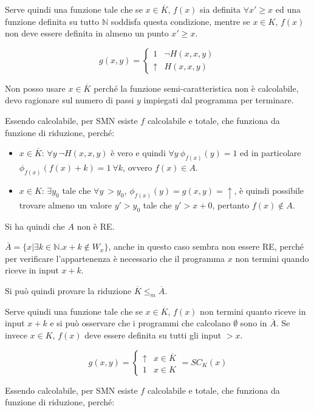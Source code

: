 Serve quindi una funzione tale che se $x \in \overline{K}$, $f(x)$ sia definita $\forall x' \geq x$ ed una funzione definita su tutto $\mathbb{N}$ soddisfa questa condizione, mentre se $x \in K$, $f(x)$ non deve essere definita in almeno un punto $x' \geq x$.

$$
g(x,y)= \begin{cases}
1 & \neg H(x,x,y) \\
\uparrow & H(x,x,y) 
\end{cases}
$$

Non posso usare $x \in \overline{K}$ perché la funzione semi-caratteristica non è calcolabile, devo ragionare sul numero di passi $y$ impiegati dal programma per terminare.

Essendo calcolabile, per SMN esiste $f$ calcolabile e totale, che funziona da funzione di riduzione, perché:

\begin{itemize}
	\item $x \in \overline{K}$: $\forall y \: \neg H(x,x,y)$ è vero e quindi $\forall y \: \phi_{f(x)}(y) = 1$ ed in particolare $\phi_{f(x)}(f(x)+k) = 1 \: \forall k$, ovvero $f(x) \in A$.
	\item $x \in K$: $\exists y_0 $ tale che $\forall y \: > y_0$, $\phi_{f(x)}(y) = g(x,y) = \uparrow$, è quindi possibile trovare almeno un valore $y' > y_0$ tale che $y' > x + 0$, pertanto $f(x) \notin A$.
\end{itemize}

Si ha quindi che $A$ non è RE.

$\overline{A} = \{ x | \exists k \in \mathbb{N} . x +k \notin W_x \}$, anche in questo caso sembra non essere RE, perché per verificare l'appartenenza è necessario che il programma $x$ non termini quando riceve in input $x+k$.

Si può quindi provare la riduzione $\overline{K} \leq_m \overline{A} $.

Serve quindi una funzione tale che se $x \in \overline{K}$, $f(x)$ non termini quanto riceve in input $x+k$ e si può osservare che i programmi che calcolano $\emptyset$ sono in $\overline{A}$. Se invece $x \in K$, $f(x)$ deve essere definita su tutti gli input $> x$.

$$
g(x,y) = \begin{cases}
\uparrow & x \in \overline{K}  \\
1 & x \in K
\end{cases} = SC_K(x)
$$

Essendo calcolabile, per SMN esiste $f$ calcolabile e totale, che funziona da funzione di riduzione, perché:

